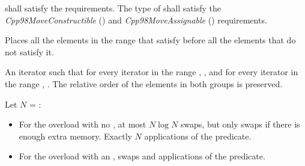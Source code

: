 \begin{itemdescr}
\pnum
\requires
{} shall satisfy the
 requirements. The type
of  shall satisfy the
\textit{Cpp98MoveConstructible} () and
\textit{Cpp98MoveAssignable} () requirements.

\pnum
\effects
Places all the elements in the range
that satisfy  before all the
elements that do not satisfy it.

\pnum
\returns
An iterator
such that for every iterator
in the range
,
,
and for every iterator
in the range
,
.
The relative order of the elements in both groups is preserved.

\pnum
\complexity
Let $N$ = :
\begin{itemize}
\item For the overload with no , at most $N \log N$ swaps,
but only  swaps if there is enough extra memory.  Exactly $N$
applications of the predicate.
\item For the overload with an ,
 swaps and  applications of the predicate.
\end{itemize}
\end{itemdescr}

